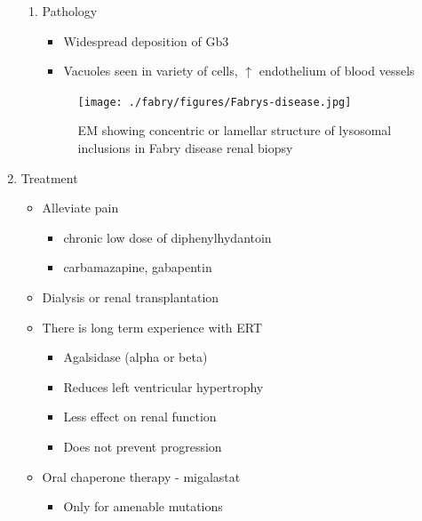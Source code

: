 \documentclass{scrartcl}
\begin{document}
\begin{enumerate}
\begin{enumerate}
\item Pathology
\label{sec:org7d92821}

\begin{itemize}
\item Widespread deposition of Gb3
\item Vacuoles seen in variety of cells, \(\uparrow\) endothelium of blood vessels
\end{itemize}

\begin{figure}[htbp]
\centering
\texttt{[image: ./fabry/figures/Fabrys-disease.jpg]}
\caption[Fabry EM]{\label{fig:org71a75ef}
EM showing concentric or lamellar structure of lysosomal inclusions in Fabry disease renal biopsy}
\end{figure}
\end{enumerate}

\item Treatment
\label{sec:org7d12504}
\begin{itemize}
\item Alleviate pain
\begin{itemize}
\item chronic low dose of diphenylhydantoin
\item carbamazapine, gabapentin
\end{itemize}
\item Dialysis or renal transplantation
\item There is long term experience with ERT
\begin{itemize}
\item Agalsidase (alpha or beta)
\item Reduces left ventricular hypertrophy
\item Less effect on renal function
\item Does not prevent progression
\end{itemize}
\item Oral chaperone therapy - migalastat
\begin{itemize}
\item Only for amenable mutations
\end{itemize}
\end{itemize}
\end{enumerate}
\end{document}
